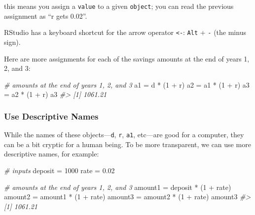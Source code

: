 \documentclass[
]{book}
\newenvironment{Shaded}{\begin{snugshade}}{\end{snugshade}}
\newcommand{\CommentTok}[1]{\textcolor[rgb]{0.56,0.35,0.01}{\textit{#1}}}
\newcommand{\DecValTok}[1]{\textcolor[rgb]{0.00,0.00,0.81}{#1}}
\newcommand{\FloatTok}[1]{\textcolor[rgb]{0.00,0.00,0.81}{#1}}
\newcommand{\NormalTok}[1]{#1}
\newcommand{\OtherTok}[1]{\textcolor[rgb]{0.56,0.35,0.01}{#1}}
\newcommand{\SpecialCharTok}[1]{\textcolor[rgb]{0.00,0.00,0.00}{#1}}
\begin{document}
this means you assign a \texttt{value} to a given \texttt{object};
you can read the previous assignment as ``r gets 0.02''.

RStudio has a keyboard shortcut for the arrow operator \texttt{\textless{}-}:
\texttt{Alt} + \texttt{-} (the minus sign).

Here are more assignments for each of the savings amounts at the end of years
1, 2, and 3:

\begin{Shaded}
\begin{Highlighting}[]
\CommentTok{\# amounts at the end of years 1, 2, and 3}
\NormalTok{a1 }\OtherTok{=}\NormalTok{ d }\SpecialCharTok{*}\NormalTok{ (}\DecValTok{1} \SpecialCharTok{+}\NormalTok{ r)}
\NormalTok{a2 }\OtherTok{=}\NormalTok{ a1 }\SpecialCharTok{*}\NormalTok{ (}\DecValTok{1} \SpecialCharTok{+}\NormalTok{ r)}
\NormalTok{a3 }\OtherTok{=}\NormalTok{ a2 }\SpecialCharTok{*}\NormalTok{ (}\DecValTok{1} \SpecialCharTok{+}\NormalTok{ r)}
\NormalTok{a3}
\CommentTok{\#\textgreater{} [1] 1061.21}
\end{Highlighting}
\end{Shaded}

\hypertarget{use-descriptive-names}{%
\subsubsection*{Use Descriptive Names}\label{use-descriptive-names}}

While the names of these objects---\texttt{d}, \texttt{r}, \texttt{a1}, etc---are good for a
computer, they can be a bit cryptic for a human being. To be more transparent,
we can use more descriptive names, for example:

\begin{Shaded}
\begin{Highlighting}[]
\CommentTok{\# inputs}
\NormalTok{deposit }\OtherTok{=} \DecValTok{1000}
\NormalTok{rate }\OtherTok{=} \FloatTok{0.02}

\CommentTok{\# amounts at the end of years 1, 2, and 3}
\NormalTok{amount1 }\OtherTok{=}\NormalTok{ deposit }\SpecialCharTok{*}\NormalTok{ (}\DecValTok{1} \SpecialCharTok{+}\NormalTok{ rate)}
\NormalTok{amount2 }\OtherTok{=}\NormalTok{ amount1 }\SpecialCharTok{*}\NormalTok{ (}\DecValTok{1} \SpecialCharTok{+}\NormalTok{ rate)}
\NormalTok{amount3 }\OtherTok{=}\NormalTok{ amount2 }\SpecialCharTok{*}\NormalTok{ (}\DecValTok{1} \SpecialCharTok{+}\NormalTok{ rate)}
\NormalTok{amount3}
\CommentTok{\#\textgreater{} [1] 1061.21}
\end{Highlighting}
\end{Shaded}
\end{document}
